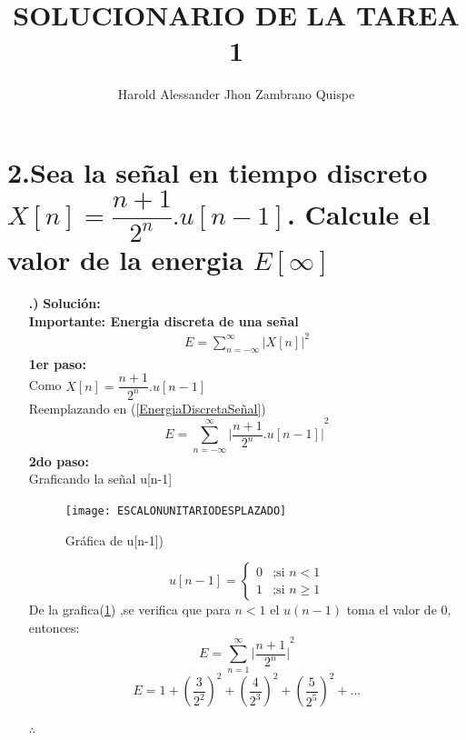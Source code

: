 \documentclass[11pt,a4paper]{article}
\author{Harold Alessander Jhon Zambrano Quispe}
\title{SOLUCIONARIO DE LA TAREA 1}
\begin{document}
   
	\section{\textbf{2.Sea la señal en tiempo discreto $X[n]=\dfrac{n+1}{2^n}. u[n-1]$. Calcule el valor de la energia $E[\infty]$}}{
	\Large{
	\begin{enumerate}
	\item[\textbf{.)}]
	\textbf{Solución:}\\
	\textbf{Importante: Energia discreta de una señal}\\
	\begin{eqnarray}	\label{EnergiaDiscretaSeñal}
	\boxed{E=\sum_{n=-\infty}^{\infty}{\vert X[n] \vert}^2}
	\end{eqnarray}
	\textbf{1er paso:}\\
	Como $X[n]=\dfrac{n+1}{2^n}. u[n-1]$\\
	Reemplazando en (\ref{EnergiaDiscretaSeñal})
	 $$E=\sum_{n=-\infty}^{\infty}{\vert \dfrac{n+1}{2^n}. u[n-1] \vert}^2$$
	 \textbf{2do paso:}\\
	 Graficando la señal u[n-1]
	\begin{center}
	\begin{figure}[h]
	 \centering 
	\texttt{[image: ESCALONUNITARIODESPLAZADO]}
	\caption{Gráfica de u[n-1])}	\label{ESCALONUNITARIODESPLAZADO}
	\end{figure}
	\end{center} 
	\begin{equation*}
	u[n-1]=
	\begin{cases}
0 & \text{;si $n < 1 $}\\
1 & \text{;si $n \geq 1$}
\end{cases}
	\end{equation*}
	De la grafica(\ref{ESCALONUNITARIODESPLAZADO})
,se verifica que para $n<1$ el $u(n-1)$ toma el valor de 0, entonces:
	$$E=\sum_{n=1}^{\infty}{\vert \dfrac{n+1}{2^n}\vert}^2$$
	$$E=1+{(\dfrac{3}{2^2})}^2+{(\dfrac{4}{2^3})}^2+{(\dfrac{5}{2^5})}^2+...$$
	\begin{center}
	$\therefore$ 
	\end{center}
	\end{enumerate}
	}}
\end{document}
